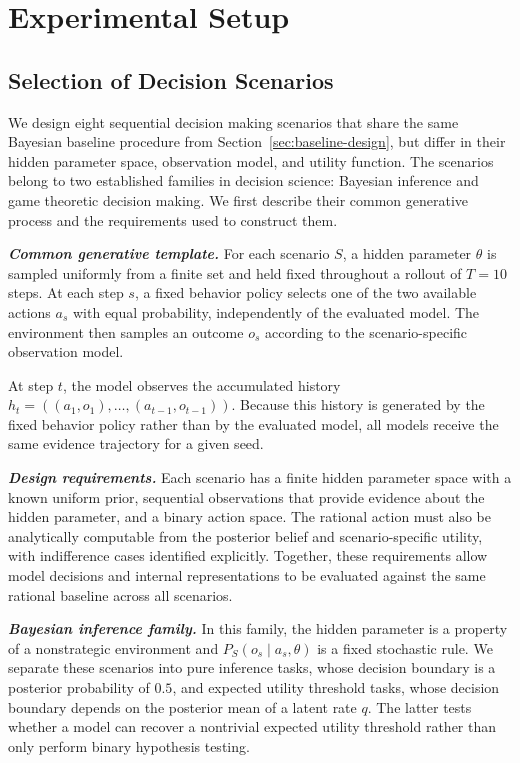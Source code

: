 \documentclass[letterpaper]{article} %
\begin{document}
\section{Experimental Setup}
\label{sec:experimental-setup}

\subsection{Selection of Decision Scenarios}
\label{sec:decision-scenarios}
\label{sec:scenarios}

We design eight sequential decision making scenarios that share the same
Bayesian baseline procedure from Section~\ref{sec:baseline-design}, but
differ in their hidden parameter space, observation model, and utility
function. The scenarios belong to two established families in decision
science: Bayesian inference and game theoretic decision making. We first
describe their common generative process and the requirements used to
construct them.

\textbf{\textit{Common generative template.}}
For each scenario \(S\), a hidden parameter \(\theta\) is sampled uniformly
from a finite set and held fixed throughout a rollout of \(T=10\) steps.
At each step \(s\), a fixed behavior policy selects one of the two available
actions \(a_s\) with equal probability, independently of the evaluated
model. The environment then samples an outcome \(o_s\) according to the
scenario-specific observation model.

At step \(t\), the model observes the accumulated history
\(h_t=((a_1,o_1),\ldots,(a_{t-1},o_{t-1}))\). Because this history is
generated by the fixed behavior policy rather than by the evaluated model,
all models receive the same evidence trajectory for a given seed.

\textbf{\textit{Design requirements.}}
Each scenario has a finite hidden parameter space with a known uniform
prior, sequential observations that provide evidence about the hidden
parameter, and a binary action space. The rational action must also be
analytically computable from the posterior belief and scenario-specific
utility, with indifference cases identified explicitly. Together, these
requirements allow model decisions and internal representations to be
evaluated against the same rational baseline across all scenarios.

\textbf{\textit{Bayesian inference family.}}
In this family, the hidden parameter is a property of a nonstrategic
environment and \(P_S(o_s\mid a_s,\theta)\) is a fixed stochastic rule.
We separate these scenarios into pure inference tasks, whose decision
boundary is a posterior probability of \(0.5\), and expected utility
threshold tasks, whose decision boundary depends on the posterior mean of
a latent rate \(q\). The latter tests whether a model can recover a
nontrivial expected utility threshold rather than only perform binary
hypothesis testing.
\end{document}
